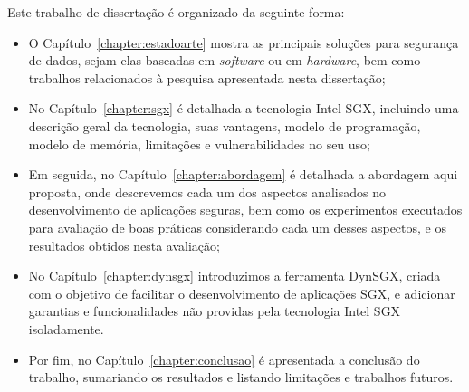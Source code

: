 Este trabalho de dissertação é organizado da seguinte forma:
\begin{itemize}
    \item O Capítulo~\ref{chapter:estadoarte} mostra as principais soluções para
    segurança de dados, sejam elas baseadas em \textit{software} ou em \textit
    {hardware}, bem como trabalhos relacionados à pesquisa apresentada nesta
    dissertação;
    \item No Capítulo~\ref{chapter:sgx} é detalhada a tecnologia Intel SGX,
    incluindo uma descrição geral da tecnologia, suas vantagens, modelo de
    programação, modelo de memória, limitações e vulnerabilidades no seu uso;
    \item Em seguida, no Capítulo~\ref{chapter:abordagem} é detalhada a
    abordagem aqui proposta, onde descrevemos cada um dos aspectos analisados no
    desenvolvimento de aplicações seguras, bem como os experimentos executados
    para avaliação de boas práticas considerando cada um desses aspectos, e os
    resultados obtidos nesta avaliação;
    \item No Capítulo~\ref{chapter:dynsgx} introduzimos a ferramenta DynSGX,
    criada com o objetivo de facilitar o desenvolvimento de aplicações SGX, e adicionar
    garantias e funcionalidades não providas pela tecnologia Intel SGX isoladamente.
    \item Por fim, no Capítulo~\ref{chapter:conclusao} é apresentada a conclusão
    do trabalho, sumariando os resultados e listando limitações e trabalhos
    futuros.
\end{itemize}